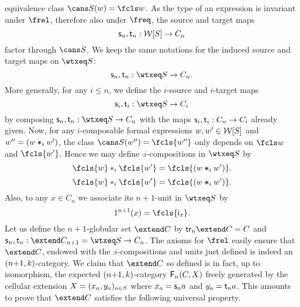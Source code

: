   equivalence class $\cans S(w)=\fcls w$. As the type of an
  expression is invariant under $\frel$, therefore also under $\freq$, 
 the source and target maps
  \[\mathsf{s}_{n},\mathsf{t}_{n}:\mathcal{W}[S]\to C_n\]
  factor through $\cans S$. We keep the same notations for the induced
  source and target maps on $\wtxeq S$:
  \[\sce n,\tge n:\wtxeq S\to C_n.\]
  More generally, for any $i\leq n$, we define the $i$-source and
  $i$-target maps
  \[\sce i,\tge i:\wtxeq S\to C_i\]
  by composing $\sce n,\tge n:\wtxeq S\to C_n$ with the maps $\mathsf{s}_{i},\mathsf{t}_{i}:C_n\to C_i$ already given. Now, for any $i$-composable formal expressions
  $w,w'\in \mathcal{W}[S]$ and $w''=(w\bm{\ast}_{i} w')$, the class $\cans S(w'')=\fcls{w''}$ only
  depends on $\fcls w$ and $\fcls{w'}$. Hence we may define 
 $\comp i$-compositions in $\wtxeq S$ by
 \[\fcls{w}\comp i\fcls{w'}=\fcls{(w\fcomp i w')}.\]
 \[\fcls{w}\comp i\fcls{w'}=\fcls{(w\fcomp i w')}.\]
 Also, to any $x\in C_n$ we associate its $n{+}1$-unit in $\wtxeq
  S$ by
  \[\unit{n+1}(x)=\fcls{\fid x}.\]
  Let us define the $n{+}1$-globular set $\extend C$ by
  $\trk n\extend C=C$ and $\sce n,\tge n:\extend C_{n+1}=\wtxeq S\to C_n$.
  The axioms for $\frel$ easily ensure that $\extend C$, endowed with
  the $\comp i$-compositions and units just defined is indeed an
  $(n{+}1,k)$-category. We claim that $\extend C$ so defined is
  in fact, up to isomorphism, the expected $(n{+}1,k)$-category
  $\mathsf{F}_{n}(C,X)$ freely generated by the cellular extension
  $X=(x_a,y_a)_{a\in S}$ where $x_a=\mathsf{s}_{n} a$ and $y_a=\mathsf{t}_{n}
  a$. This amounts to prove that $\extend C$ satisfies the following universal property.
  
